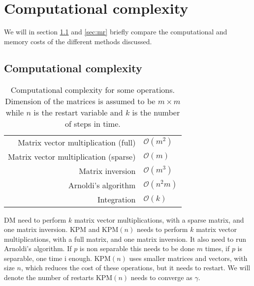 \chapter{Computational complexity}%
\label{sec:comp}
We will in section \ref{sec:cc} and \ref{sec:mr} briefly compare the computational and memory costs of the different methods discussed.%
\section{Computational complexity} \label{sec:cc}
\begin{table}[h!]
\centering
\begin{tabular}{r | l}
 Matrix vector multiplication (full) & $\mathcal{O}(m^2)$ \cite{complex} \\
 Matrix vector multiplication (sparse) & $\mathcal{O}(m)$ \\
 Matrix inversion  & $ \mathcal{O}(m^3)$ \cite{complex} \\
 Arnoldi's algorithm & $ \mathcal{O}(n^2 m)$ \cite{numop} \\
 Integration & $\mathcal{O}(k)$
\end{tabular}
\caption{Computational complexity for some operations. Dimension of the matrices is assumed to be $m \times m$ while $n$ is the restart variable and $k$ is the number of steps in time.}
\label{tab:runtime}
\end{table}
DM need to perform $k$ matrix vector multiplications, with a sparse matrix, and one matrix inversion. 
KPM and KPM$(n)$ needs to perform $k$ matrix vector multiplications, with a full matrix, and one matrix inversion. It also need to run Arnoldi's algorithm. If $p$ is non separable this needs to be done $m$ times, if $p$ is separable, one time i enough. KPM$(n)$ uses smaller matrices and vectors, with size $n$, which reduces the cost of these operations, but it needs to restart. We will denote the number of restarts KPM$(n)$ needs to converge as $\gamma$. \\

